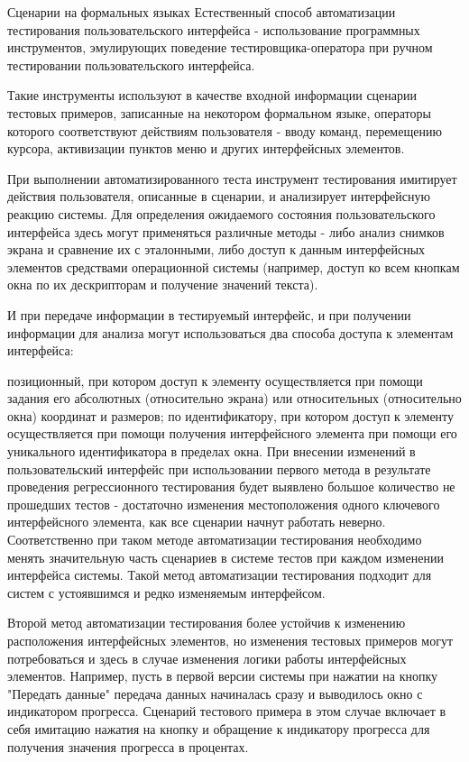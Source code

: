 \documentclass{../industrial-development}
\begin{document}
\lecturenotes

Сценарии на формальных языках
Естественный способ автоматизации тестирования пользовательского интерфейса - использование программных инструментов, эмулирующих поведение тестировщика-оператора при ручном тестировании пользовательского интерфейса.

Такие инструменты используют в качестве входной информации сценарии тестовых примеров, записанные на некотором формальном языке, операторы которого соответствуют действиям пользователя - вводу команд, перемещению курсора, активизации пунктов меню и других интерфейсных элементов.

При выполнении автоматизированного теста инструмент тестирования имитирует действия пользователя, описанные в сценарии, и анализирует интерфейсную реакцию системы. Для определения ожидаемого состояния пользовательского интерфейса здесь могут применяться различные методы - либо анализ снимков экрана и сравнение их с эталонными, либо доступ к данным интерфейсных элементов средствами операционной системы (например, доступ ко всем кнопкам окна по их дескрипторам и получение значений текста).

И при передаче информации в тестируемый интерфейс, и при получении информации для анализа могут использоваться два способа доступа к элементам интерфейса:

позиционный, при котором доступ к элементу осуществляется при помощи задания его абсолютных (относительно экрана) или относительных (относительно окна) координат и размеров;
по идентификатору, при котором доступ к элементу осуществляется при помощи получения интерфейсного элемента при помощи его уникального идентификатора в пределах окна.
При внесении изменений в пользовательский интерфейс при использовании первого метода в результате проведения регрессионного тестирования будет выявлено большое количество не прошедших тестов - достаточно изменения местоположения одного ключевого интерфейсного элемента, как все сценарии начнут работать неверно. Соответственно при таком методе автоматизации тестирования необходимо менять значительную часть сценариев в системе тестов при каждом изменении интерфейса системы. Такой метод автоматизации тестирования подходит для систем с устоявшимся и редко изменяемым интерфейсом.

Второй метод автоматизации тестирования более устойчив к изменению расположения интерфейсных элементов, но изменения тестовых примеров могут потребоваться и здесь в случае изменения логики работы интерфейсных элементов. Например, пусть в первой версии системы при нажатии на кнопку "Передать данные" передача данных начиналась сразу и выводилось окно с индикатором прогресса. Сценарий тестового примера в этом случае включает в себя имитацию нажатия на кнопку и обращение к индикатору прогресса для получения значения прогресса в процентах.
\end{document}
